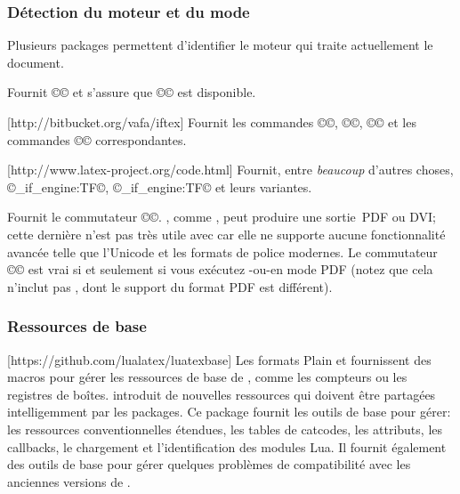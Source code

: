 \documentclass{lltxdoc}
\begin{document}
\subsubsection{Détection du moteur et du mode}\label{detect}

Plusieurs packages permettent d'identifier le moteur qui traite actuellement le document.

Fournit ©\ifluatex© et s'assure que ©\luatexversion© est disponible.

[http://bitbucket.org/vafa/iftex]
Fournit les commandes ©\ifPDFTeX©, ©\ifXeTeX©, ©\ifLuaTeX© et les commandes
©\Require© correspondantes.

[http://www.latex-project.org/code.html]
Fournit, entre \emph{beaucoup} d'autres choses, ©\luatex_if_engine:TF©,
©\xetex_if_engine:TF© et leurs variantes.

Fournit le commutateur ©\ifpdf©. \luatex, comme \pdftex, peut produire une
sortie~PDF ou DVI; cette dernière n'est pas très utile avec \luatex car elle
ne supporte aucune fonctionnalité avancée telle que l'Unicode et les formats
de police modernes. Le commutateur ©\ifpdf© est vrai si et seulement si vous
exécutez \pdftex-ou-\luatex en mode PDF (notez que cela n'inclut pas \xetex,
dont le support du format PDF est différent).


\subsubsection{Ressources de base}

[https://github.com/lualatex/luatexbase]
Les formats Plain et \latex fournissent des macros pour gérer les ressources
de base de \tex, comme les compteurs ou les registres de boîtes.
\luatex introduit de nouvelles ressources qui doivent être partagées intelligemment
par les packages. Ce package fournit les outils de base pour gérer: les
ressources \tex conventionnelles étendues, les tables de catcodes, les attributs,
les callbacks, le chargement et l'identification des modules Lua. Il fournit
également des outils de base pour gérer quelques problèmes de compatibilité
avec les anciennes versions de \luatex.
\end{document}
